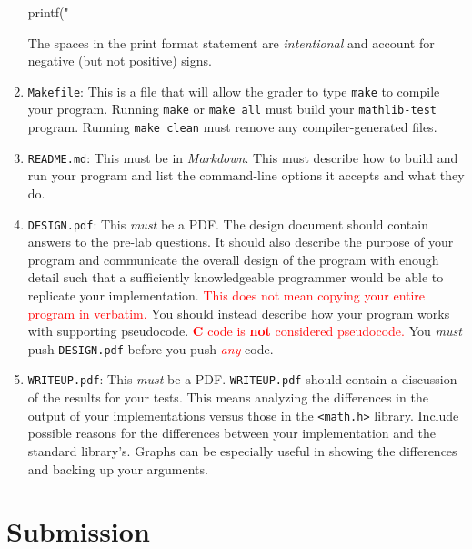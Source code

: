 \documentclass[11pt]{article}
\begin{document}
\begin{enumerate}
    \begin{codelisting}{}
printf(" %
    \end{codelisting}

    The spaces in the print format statement are \emph{intentional} and account for
    negative (but not positive) signs.

  \item \texttt{Makefile}: This is a file that will allow the grader to type
    \texttt{make} to compile your program. Running \texttt{make} or \texttt{make
    all} must build your \texttt{mathlib-test} program. Running \texttt{make clean}
    must remove any compiler-generated files.

  \item \texttt{README.md}: This must be in \emph{Markdown}. This must describe
    how to build and run your program and list the command-line options it
    accepts and what they do.

  \item \texttt{DESIGN.pdf}: This \emph{must} be a PDF\@. The design document
    should contain answers to the pre-lab questions. It should also describe the
    purpose of your program and communicate the overall design of the program
    with enough detail such that a sufficiently knowledgeable programmer would
    be able to replicate your implementation. \textcolor{red}{This does not
    mean copying your entire program in verbatim.} You should instead describe
    how your program works with supporting pseudocode.
    \textcolor{red}{\textbf{C} code is \textbf{not} considered pseudocode.} You
    \emph{must} push \texttt{DESIGN.pdf} before you push \textcolor{red}{\emph{any}}
    code.

  \item \texttt{WRITEUP.pdf}: This \emph{must} be a PDF\@. \texttt{WRITEUP.pdf}
    should contain a discussion of the results for your tests. This means
    analyzing the differences in the output of your implementations versus those
    in the \texttt{<math.h>} library. Include possible reasons for the differences
    between your implementation and the standard library's. Graphs can be
    especially useful in showing the differences and backing up your arguments.
\end{enumerate}


\section{Submission}
\end{document}
